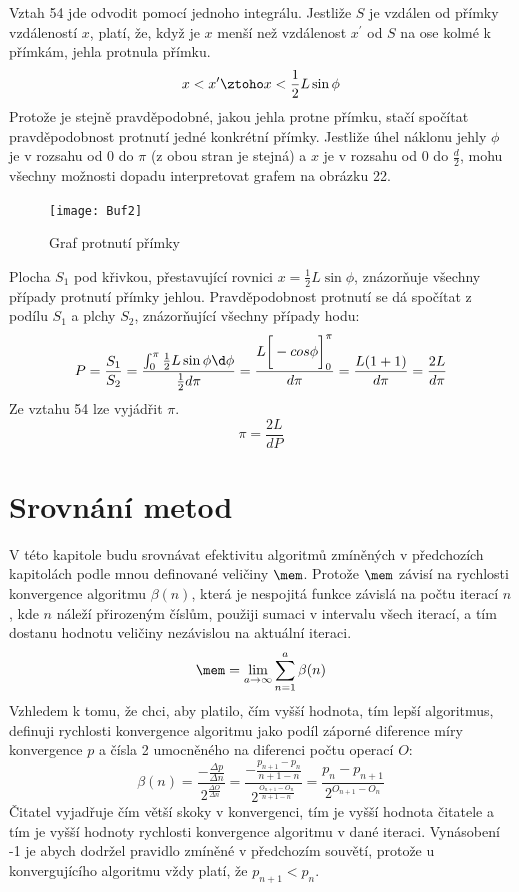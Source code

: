 \documentclass[rocnikovka]{gzwroc} %
\begin{document}
Vztah 54 jde odvodit pomocí jednoho integrálu. Jestliže $S$ je vzdálen od přímky vzdáleností $x$, platí, že, když je $x$ menší než vzdálenost $x^\prime$ od $S$ na ose kolmé k přímkám, jehla protnula přímku.
$$
x<x^\prime \ztoho x<\frac{1}{2}L\sin\phi
$$
Protože je stejně pravděpodobné, jakou jehla protne přímku, stačí spočítat pravděpodobnost protnutí jedné konkrétní přímky. Jestliže úhel náklonu jehly $\phi$ je v rozsahu od 0 do $\pi$ (z obou stran je stejná) a $x$ je v rozsahu od 0 do $\frac{d}{2}$, mohu všechny možnosti dopadu interpretovat grafem na obrázku 22.
\begin{figure}[!ht]
\texttt{[image: Buf2]}
\caption{Graf protnutí přímky}
\label{fig:kruh}
\end{figure}
Plocha $S_1$ pod křivkou, přestavující rovnici $x=\frac{1}{2}L\sin\phi$, znázorňuje všechny případy protnutí přímky jehlou. Pravděpodobnost protnutí se dá spočítat z podílu $S_1$ a plchy $S_2$, znázorňující všechny případy hodu:
$$
P=\frac{S_1}{S_2}=\frac{\int_0^\pi \frac{1}{2}L\sin \phi \d \phi}{\frac{1}{2}d\pi}=\frac{L\bigg[-cos \phi \bigg]^\pi_0}{d\pi}=\frac{L(1+1)}{d\pi}=\frac{2L}{d\pi}
$$
Ze vztahu 54 lze vyjádřit $\pi$.
\begin{equation}
\pi=\frac{2L}{dP}
\end{equation}

\section{Srovnání metod}
V této kapitole budu srovnávat efektivitu algoritmů zmíněných v předchozích kapitolách podle mnou definované veličiny $\mem$. Protože $\mem$ závisí na rychlosti konvergence algoritmu $\beta(n)$, která je nespojitá funkce závislá na počtu iterací $n$, kde $n$ náleží přirozeným číslům, použiji sumaci v intervalu všech iterací, a tím dostanu hodnotu veličiny nezávislou na aktuální iteraci.
$$
\mem=\lim_{a\to\infty} \sum_{n=1}^{a}\beta(n)
$$
Vzhledem k tomu, že chci, aby platilo, čím vyšší hodnota, tím lepší algoritmus, definuji rychlosti konvergence algoritmu jako podíl záporné diference míry konvergence $p$ a čísla 2 umocněného na diferenci počtu operací $O$:
$$
\beta(n)=\frac{-\frac{\Delta p}{\Delta n}}{2^{\frac{\Delta O}{\Delta n}}}=\frac{-\frac{p_{n+1}-p_n}{n+1-n}}{2^{\frac{O_{n+1}-O_n}{n+1-n}}}=\frac{p_n-p_{n+1}}{2^{O_{n+1}-O_n}}
$$
Čitatel vyjadřuje čím větší skoky v konvergenci, tím je vyšší hodnota čitatele a tím je vyšší hodnoty rychlosti konvergence algoritmu v dané iteraci. Vynásobení -1 je abych dodržel pravidlo zmíněné v předchozím souvětí, protože u konvergujícího algoritmu vždy platí, že $p_{n+1}<p_n$.
\end{document}
